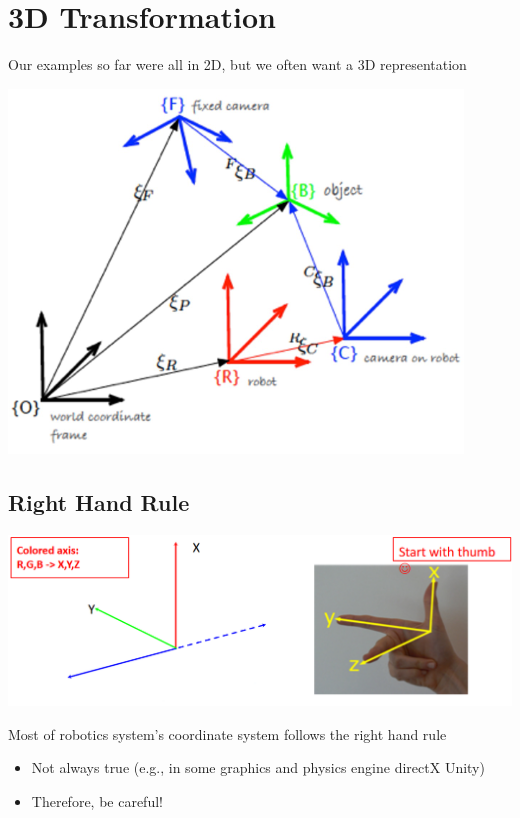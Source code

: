 \documentclass[10pt]{article}
\begin{document}
\section*{3D Transformation}
Our examples so far were all in 2D, but we often want a 3D representation
\begin{center} 
	\includegraphics*{L1_4.png} 
\end{center}


\subsection*{Right Hand Rule}
\begin{center} 
	\includegraphics*[width=\textwidth]{L1_5.png} 
\end{center}

Most of robotics system's coordinate system follows the right hand rule
\begin{itemize}
	\item Not always true (e.g., in some graphics and physics engine directX Unity)
	\item Therefore, be careful!
\end{itemize}
\end{document}

